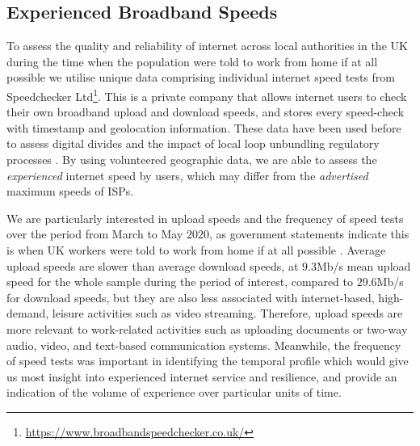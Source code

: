 \documentclass[Royal,times,sageh]{sagej}
\begin{document}
\hypertarget{sec:3.2}{%
\subsection{Experienced Broadband Speeds}\label{sec:3.2}}

To assess the quality and reliability of internet across local
authorities in the UK during the time when the population were told to
work from home if at all possible we utilise unique data comprising
individual internet speed tests from Speedchecker Ltd\footnote{\url{https://www.broadbandspeedchecker.co.uk/}}.
This is a private company that allows internet users to check their own
broadband upload and download speeds, and stores every speed-check with
timestamp and geolocation information. These data have been used before
to assess digital divides \citep{riddlesden2014broadband} and the impact
of local loop unbundling regulatory processes
\citep{nardotto2015unbundling}. By using volunteered geographic data, we
are able to assess the \emph{experienced} internet speed by users, which
may differ from the \emph{advertised} maximum speeds of ISPs.

We are particularly interested in upload speeds and the frequency of
speed tests over the period from March to May \(2020\), as government
statements indicate this is when UK workers were told to work from home
if at all possible \citep{GovUK2020}. Average upload speeds are slower
than average download speeds, at \(9.3\)Mb/s mean upload speed for the
whole sample during the period of interest, compared to \(29.6\)Mb/s for
download speeds, but they are also less associated with internet-based,
high-demand, leisure activities such as video streaming. Therefore,
upload speeds are more relevant to work-related activities such as
uploading documents or two-way audio, video, and text-based
communication systems. Meanwhile, the frequency of speed tests was
important in identifying the temporal profile which would give us most
insight into experienced internet service and resilience, and provide an
indication of the volume of experience over particular units of time.
\end{document}
